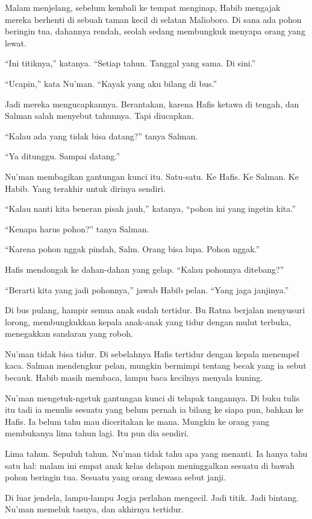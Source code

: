Malam menjelang, sebelum kembali ke tempat menginap, Habib mengajak mereka berhenti di sebuah taman kecil di selatan Malioboro. Di sana ada pohon beringin tua, dahannya rendah, seolah sedang membungkuk menyapa orang yang lewat.

``Ini titiknya,'' katanya. ``Setiap tahun. Tanggal yang sama. Di sini.''

``Ucapin,'' kata Nu'man. ``Kayak yang aku bilang di bus.''

Jadi mereka mengucapkannya. Berantakan, karena Hafis ketawa di tengah, dan Salman salah menyebut tahunnya. Tapi diucapkan.

``Kalau ada yang tidak bisa datang?'' tanya Salman.

``Ya ditunggu. Sampai datang.''

Nu'man membagikan gantungan kunci itu. Satu-satu. Ke Hafis. Ke Salman. Ke Habib. Yang terakhir untuk dirinya sendiri.

``Kalau nanti kita beneran pisah jauh,'' katanya, ``pohon ini yang ingetin kita.''

``Kenapa harus pohon?'' tanya Salman.

``Karena pohon nggak pindah, Salm. Orang bisa lupa. Pohon nggak.''

Hafis mendongak ke dahan-dahan yang gelap. ``Kalau pohonnya ditebang?''

``Berarti kita yang jadi pohonnya,'' jawab Habib pelan. ``Yang jaga janjinya.''

Di bus pulang, hampir semua anak sudah tertidur. Bu Ratna berjalan menyusuri lorong, membungkukkan kepala anak-anak yang tidur dengan mulut terbuka, menegakkan sandaran yang roboh.

Nu'man tidak bisa tidur. Di sebelahnya Hafis tertidur dengan kepala menempel kaca. Salman mendengkur pelan, mungkin bermimpi tentang becak yang ia sebut becauk. Habib masih membaca, lampu baca kecilnya menyala kuning.

Nu'man mengetuk-ngetuk gantungan kunci di telapak tangannya. Di buku tulis itu tadi ia menulis sesuatu yang belum pernah ia bilang ke siapa pun, bahkan ke Hafis. Ia belum tahu mau diceritakan ke mana. Mungkin ke orang yang membukanya lima tahun lagi. Itu pun dia sendiri.

Lima tahun. Sepuluh tahun. Nu'man tidak tahu apa yang menanti. Ia hanya tahu satu hal: malam ini empat anak kelas delapan meninggalkan sesuatu di bawah pohon beringin tua. Sesuatu yang orang dewasa sebut janji.

Di luar jendela, lampu-lampu Jogja perlahan mengecil. Jadi titik. Jadi bintang. Nu'man memeluk tasnya, dan akhirnya tertidur.

\jedahias
